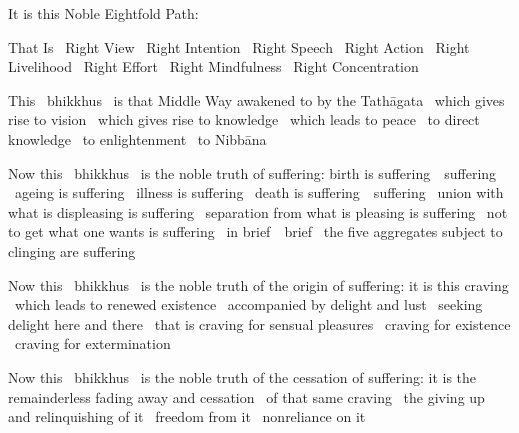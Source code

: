 \begin{english-only-hang}
  It is this Noble Eightfold Path:
\end{english-only-hang}

\begin{english-only-hang}
  That Is \breathmark\ Right View \breathmark\ Right Intention \breathmark\ Right Speech \breathmark\ Right Action \breathmark\ Right Livelihood \breathmark\ Right Effort \breathmark\ Right Mindfulness \breathmark\ Right Concentration
\end{english-only-hang}

\begin{english-only-hang}
  This \breathmark\ bhikkhus \breathmark\ is that Middle Way awakened to by the Tathāgata \breathmark\ which gives rise to vision \breathmark\ which gives rise to knowledge \breathmark\ which leads to peace \breathmark\ to direct knowledge \breathmark\ to enlightenment \breathmark\ to Nibbāna
\end{english-only-hang}

\begin{english-only-hang}
  Now this \breathmark\ bhikkhus \breathmark\ is the noble truth of suffering: birth is \ifbsixversion \mbox{suffering}~\breathmark\ \else suffering \breathmark\ \fi ageing is suffering \breathmark\ illness is suffering \breathmark\ death is \ifbsixversion \mbox{suffering}~\breathmark\ \else suffering \breathmark\ \fi union with what is displeasing is suffering \breathmark\ separation from what is pleasing is suffering \breathmark\ not to get what one wants is suffering \breathmark\ in \ifbsixversion \mbox{brief}~\breathmark\ \else brief \breathmark\ \fi the five aggregates subject to clinging are suffering
\end{english-only-hang}

\begin{english-only-hang}
  Now this \breathmark\ bhikkhus \breathmark\ is the noble truth of the origin of suffering: it is this craving \breathmark\ which leads to renewed existence \breathmark\ accompanied by delight and lust \breathmark\ seeking delight here and there \breathmark\ that is craving for sensual pleasures \breathmark\ craving for existence \breathmark\ craving for extermination
\end{english-only-hang}

\begin{english-only-hang}
  Now this \breathmark\ bhikkhus \breathmark\ is the noble truth of the cessation of suffering: it is the remainderless fading away and cessation \breathmark\ of that same craving \breathmark\ the giving up and relinquishing of it \breathmark\ freedom from it \breathmark\ nonreliance on it
\end{english-only-hang}


